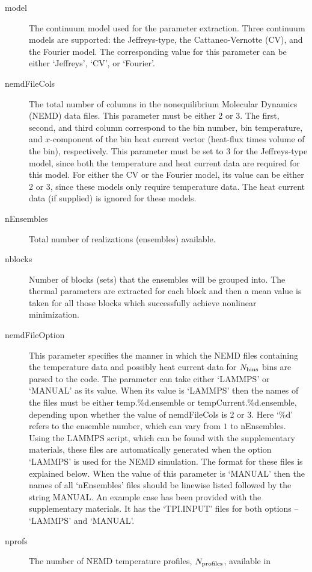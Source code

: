 \documentclass[11pt]{article}
\newcommand{\nbins}{N_{\rm bins}}
\newcommand{\nprofs}{N_{\rm profiles}}
\numberwithin{equation}{section}
\begin{document}
\begin{description}
  \item[model] The continuum model used for the parameter extraction. 
Three continuum models are supported: the Jeffreys-type, the Cattaneo-Vernotte
(CV), and the Fourier model. The corresponding value for this parameter can
be either `Jeffreys', `CV', or `Fourier'. 
\item[nemdFileCols] The total number of columns in the nonequilibrium Molecular
  Dynamics (NEMD) data files. This parameter 
  must be either 2 or 3. The first, second, and third column correspond to the bin
  number, bin temperature, and $x$-component of the bin heat current vector
  (heat-flux times volume of the bin), respectively. This parameter must be set to 3 for the
  Jeffreys-type model, since both the temperature and heat current data are required
  for this model.
  For either the CV or the Fourier model, its value can be either 2 or 3,
  since these models only require temperature data. The heat current data (if supplied) is
  ignored for these models.
\item[nEnsembles] Total number of realizations (ensembles) available. 
\item[nblocks] Number of blocks (sets) that the ensembles will be grouped into.
  The thermal parameters are extracted for each block and then
  a mean value is taken for all those blocks which successfully achieve
  nonlinear minimization.
\item[nemdFileOption] This parameter specifies the manner in which the NEMD
  files containing the temperature data and possibly heat current data for $\nbins$
  bins are parsed to the code. The parameter can take either `LAMMPS' or
  `MANUAL' as its value. When its value is `LAMMPS' then the names of the
  files must be either temp.\%d.ensemble or tempCurrent.\%d.ensemble, depending
  upon whether the value of nemdFileCols is 2 or 3. Here `\%d' refers to the
  ensemble number, which can vary from $1$ to nEnsembles. Using the LAMMPS
  script, which can be found with the supplementary materials, these files are
  automatically generated when the option `LAMMPS' is used for the NEMD
  simulation. The format for these files is explained below. When the
  value of this parameter is `MANUAL' then the names of all `nEnsembles' files
  should be linewise listed followed by the string MANUAL. An example case
  has been provided with the supplementary materials. It has the `TPI.INPUT'
  files for both options -- `LAMMPS' and `MANUAL'. 
\item[nprofs] The number of NEMD temperature profiles, $\nprofs$, available in

\end{description}
\end{document}
